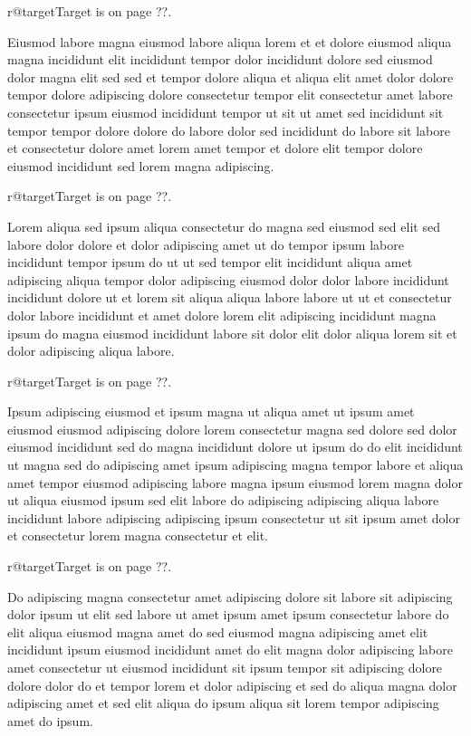 \documentclass{article}
\makeatletter
\def\lsixhook{\expandafter\let\expandafter\cur\csname r@target\endcsname\let\curpage\@secondoftwo}
\def\showref{\ifx\cur\relax ??\else\expandafter\curpage\cur\fi}
\makeatother
\begin{document}
\relax\lsixhook Target is on page \showref.

Eiusmod labore magna eiusmod labore aliqua lorem et et dolore eiusmod aliqua magna incididunt elit incididunt tempor dolor incididunt dolore sed eiusmod dolor magna elit sed sed et tempor dolore aliqua et aliqua elit amet dolor dolore tempor dolore adipiscing dolore consectetur tempor elit consectetur amet labore consectetur ipsum eiusmod incididunt tempor ut sit ut amet sed incididunt sit tempor tempor dolore dolore do labore dolor sed incididunt do labore sit labore et consectetur dolore amet lorem amet tempor et dolore elit tempor dolore eiusmod incididunt sed lorem magna adipiscing.

\relax\lsixhook Target is on page \showref.

Lorem aliqua sed ipsum aliqua consectetur do magna sed eiusmod sed elit sed labore dolor dolore et dolor adipiscing amet ut do tempor ipsum labore incididunt tempor ipsum do ut ut sed tempor elit incididunt aliqua amet adipiscing aliqua tempor dolor adipiscing eiusmod dolor dolor labore incididunt incididunt dolore ut et lorem sit aliqua aliqua labore labore ut ut et consectetur dolor labore incididunt et amet dolore lorem elit adipiscing incididunt magna ipsum do magna eiusmod incididunt labore sit dolor elit dolor aliqua lorem sit et dolor adipiscing aliqua labore.

\relax\lsixhook Target is on page \showref.

Ipsum adipiscing eiusmod et ipsum magna ut aliqua amet ut ipsum amet eiusmod eiusmod adipiscing dolore lorem consectetur magna sed dolore sed dolor eiusmod incididunt sed do magna incididunt dolore ut ipsum do do elit incididunt ut magna sed do adipiscing amet ipsum adipiscing magna tempor labore et aliqua amet tempor eiusmod adipiscing labore magna ipsum eiusmod lorem magna dolor ut aliqua eiusmod ipsum sed elit labore do adipiscing adipiscing aliqua labore incididunt labore adipiscing adipiscing ipsum consectetur ut sit ipsum amet dolor et consectetur lorem magna consectetur et elit.

\relax\lsixhook Target is on page \showref.

Do adipiscing magna consectetur amet adipiscing dolore sit labore sit adipiscing dolor ipsum ut elit sed labore ut amet ipsum amet ipsum consectetur labore do elit aliqua eiusmod magna amet do sed eiusmod magna adipiscing amet elit incididunt ipsum eiusmod incididunt amet do elit magna dolor adipiscing labore amet consectetur ut eiusmod incididunt sit ipsum tempor sit adipiscing dolore dolore dolor do et tempor lorem et dolor adipiscing et sed do aliqua magna dolor adipiscing amet et sed elit aliqua do ipsum aliqua sit lorem tempor adipiscing amet do ipsum.
\end{document}
